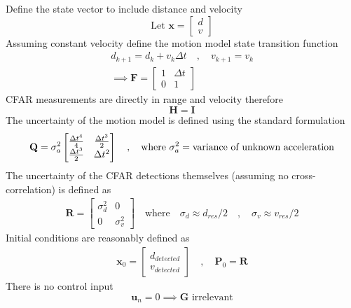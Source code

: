 \documentclass{article}
\begin{document}
Define the state vector to include distance and velocity
\begin{equation*}
    \text{Let } \mathbf{x} = \begin{bmatrix} d \\ v \end{bmatrix}
\end{equation*}
Assuming constant velocity define the motion model state transition function
\begin{gather*}
    d_{k+1} = d_k + v_k \Delta t \quad , \quad v_{k+1} = v_k \\
    \implies \mathbf{F} = \begin{bmatrix}
        1 & \Delta t \\
        0 & 1
    \end{bmatrix}
\end{gather*}
CFAR measurements are directly in range and velocity therefore
\begin{equation*}
    \mathbf{H} = \mathbf{I}
\end{equation*}
The uncertainty of the motion model is defined using the standard formulation
\begin{equation*}
    \mathbf{Q} = \sigma_a^2 \begin{bmatrix}
        \frac{\Delta t^4}{4} & \frac{\Delta t^3}{2} \\
        \frac{\Delta t^3}{2} & \Delta t^2
    \end{bmatrix} \quad , \quad \text{where } \sigma_a^2 = \text{variance of unknown acceleration} \\
\end{equation*}
The uncertainty of the CFAR detections themselves (assuming no cross-correlation) is defined as
\begin{gather*}
    \mathbf{R} = \begin{bmatrix}
        \sigma_d^2 & 0 \\
        0 & \sigma_v^2
    \end{bmatrix} \quad \text{where} \quad
    \sigma_d \approx d_{res}/2 \quad , \quad \sigma_v \approx v_{res}/2
\end{gather*}
Initial conditions are reasonably defined as
\begin{gather*}
    \mathbf{x}_0 = \begin{bmatrix}d_{detected} \\ v_{detected}\end{bmatrix}
    \quad , \quad \mathbf{P}_0 = \mathbf{R}
\end{gather*}
There is no control input
\begin{equation*}
    \mathbf{u}_n = 0 \implies \mathbf{G} \text{ irrelevant}
\end{equation*}
\end{document}
